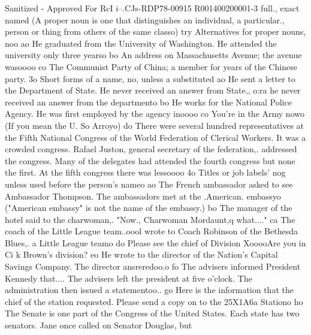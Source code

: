 \documentclass[
    oneside,
    11pt,
    draft
]{memoir}
\begin{document}
Sanitized - Approved For RcI i--.CJs-RDP78-00915 R001400200001-3 full., exact named (A proper noun is one that distinguishes an individual, a particular., person or thing from others of the same classo) try Alternatives for proper nouns, noo ao He graduated from the University of Washington. He attended the university only three yearso bo An address on Massachusetts Avenue; the avenue wasoooo co The Communist Party of China; a member for years of the Chinese party. 3o Short forms of a name, no, unless a substituted ao He sent a letter to the Department of State. He never received an answer from State,, o:ra he never received an answer from the departmento bo He works for the National Police Agency. He was first employed by the agency inoooo co You're in the Army nowo (If you mean the U. So Arroyo) do There were several hundred representatives at the Fifth National Congress of the World Federation of Clerical Workers. It was a crowded congress. Rafael Juston, general secretary of the federation,. addressed the congress. Many of the delegates had attended the fourth congress but none the first. At the fifth congress there was lessoooo 4o Titles or job labels' nog unless used before the person's nameo ao The French ambassador asked to see Ambassador Thompson. The ambassadors met at the .American. embassyo ("American embassy" is not the name of the embassy.) bo The manager of the hotel said to the charwoman,. "Now., Charwoman Mordaunt,q what...." ca The coach of the Little League team..oool wrote to Coach Robinson of the Bethesda Blues,. a Little League teamo do Please see the chief of Division XooooAre you in Ci k Brown's division? eo He wrote to the director of the Nation's Capital Savings Company. The director ansreredoo.o fo The advisers informed President Kennedy that.... The advisers left the president at five o'clock. The administration then issued a statementoo.. go Here is the information that the chief of the station requested. Please send a copy on to the 25X1A6a Stationo ho The Senate is one part of the Congress of the United States. Each state has two senators. Jane once called on Senator Douglas, but
\end{document}
